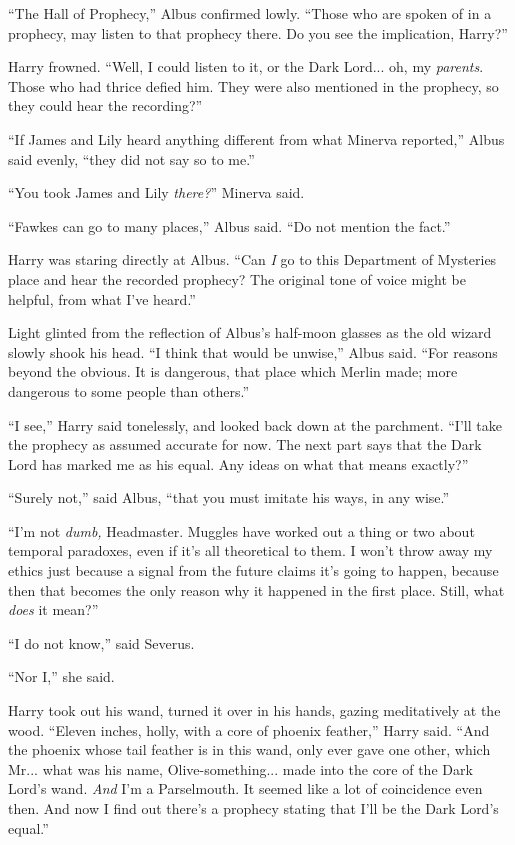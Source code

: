 ``The Hall of Prophecy,'' Albus confirmed lowly. ``Those who are spoken of in a prophecy, may listen to that prophecy there. Do you see the implication, Harry?''

Harry frowned. ``Well, I could listen to it, or the Dark Lord... oh, my \emph{parents}. Those who had thrice defied him. They were also mentioned in the prophecy, so they could hear the recording?''

``If James and Lily heard anything different from what Minerva reported,'' Albus said evenly, ``they did not say so to me.''

``You took James and Lily \emph{there?}'' Minerva said.

``Fawkes can go to many places,'' Albus said. ``Do not mention the fact.''

Harry was staring directly at Albus. ``Can \emph{I} go to this Department of Mysteries place and hear the recorded prophecy? The original tone of voice might be helpful, from what I've heard.''

Light glinted from the reflection of Albus's half-moon glasses as the old wizard slowly shook his head. ``I think that would be unwise,'' Albus said. ``For reasons beyond the obvious. It is dangerous, that place which Merlin made; more dangerous to some people than others.''

``I see,'' Harry said tonelessly, and looked back down at the parchment. ``I'll take the prophecy as assumed accurate for now. The next part says that the Dark Lord has marked me as his equal. Any ideas on what that means exactly?''

``Surely not,'' said Albus, ``that you must imitate his ways, in any wise.''

``I'm not \emph{dumb,} Headmaster. Muggles have worked out a thing or two about temporal paradoxes, even if it's all theoretical to them. I won't throw away my ethics just because a signal from the future claims it's going to happen, because then that becomes the only reason why it happened in the first place. Still, what \emph{does} it mean?''

``I do not know,'' said Severus.

``Nor I,'' she said.

Harry took out his wand, turned it over in his hands, gazing meditatively at the wood. ``Eleven inches, holly, with a core of phoenix feather,'' Harry said. ``And the phoenix whose tail feather is in this wand, only ever gave one other, which Mr... what was his name, Olive-something... made into the core of the Dark Lord's wand. \emph{And} I'm a Parselmouth. It seemed like a lot of coincidence even then. And now I find out there's a prophecy stating that I'll be the Dark Lord's equal.''

